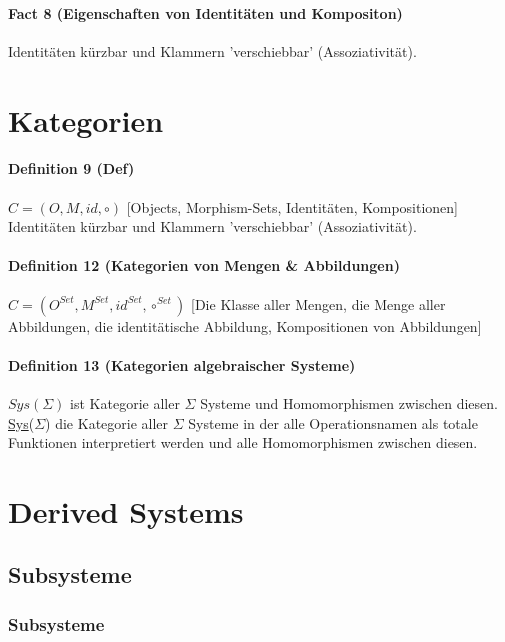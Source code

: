 \paragraph{Fact 8 (Eigenschaften von Identitäten und Kompositon)}
Identitäten kürzbar und Klammern 'verschiebbar'  (Assoziativität).

\section{Kategorien}

\paragraph{Definition 9 (Def)}

$C= (O, M, id, \circ)$ [Objects, Morphism-Sets, Identitäten, Kompositionen] \\
Identitäten kürzbar und Klammern 'verschiebbar'  (Assoziativität).

\paragraph{Definition 12 (Kategorien von Mengen \& Abbildungen)}
$C= (O^{Set}, M^{Set}, id^{Set}, \circ^{Set})$ [Die Klasse aller Mengen, die Menge aller Abbildungen, die identitätische Abbildung, Kompositionen von Abbildungen] \\

\paragraph{Definition 13 (Kategorien algebraischer Systeme)}
$Sys(\Sigma)$ ist Kategorie aller $\Sigma$ Systeme und Homomorphismen zwischen diesen. \\
\underline{Sys}($\Sigma$) die Kategorie aller $\Sigma$ Systeme in der alle Operationsnamen als totale Funktionen interpretiert werden und alle Homomorphismen zwischen diesen.

\section{Derived Systems}

\subsection{Subsysteme}

\subsubsection{Subsysteme}
